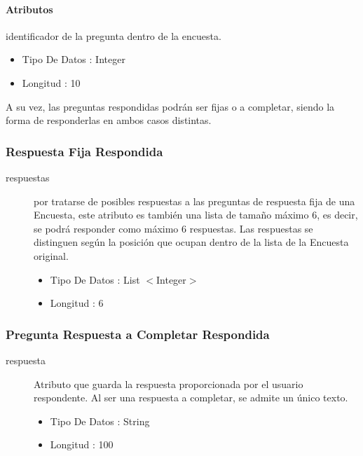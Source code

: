 \documentclass{article}
\begin{document}
\paragraph{\large{Atributos}}

\begin{description}
\item[idPregunta] identificador de la pregunta dentro de la encuesta.
\begin{itemize}
\item Tipo De Datos : Integer
\item Longitud : 10
\end{itemize} 
\item A su vez, las preguntas respondidas podr\'an ser fijas o a completar, siendo la forma de responderlas en ambos casos distintas. 
\end{description}

\subsubsection{Respuesta Fija Respondida}

\begin{description}
\item[respuestas] por tratarse de posibles respuestas a las preguntas de respuesta fija de una Encuesta, este atributo es tambi\'en una lista de tamaño m\'aximo 6, es decir, se podr\'a responder como m\'aximo 6 respuestas. Las respuestas se distinguen seg\'un la posici\'on que ocupan dentro de la lista de la Encuesta original.
\begin{itemize}
\item Tipo De Datos : List $<$Integer$>$
\item Longitud : 6
\end{itemize}
\end{description}

\subsubsection{Pregunta Respuesta a Completar Respondida}

\begin{description}
\item[respuesta] Atributo que guarda la respuesta proporcionada por el usuario respondente. Al ser una respuesta a completar, se admite un \'unico texto.
\begin{itemize}
\item Tipo De Datos : String
\item Longitud : 100
\end{itemize} 
\end{description}
\end{document}
